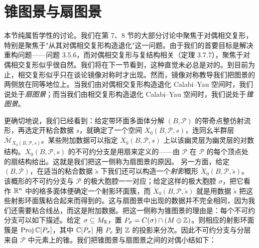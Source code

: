 \section{锥图景与扇图景}

本节纯属哲学性的讨论。我们在第 7、8 节的大部分讨论中聚焦于对偶相交复形，特别是聚焦于"从其对偶相交复形构造退化"这一问题。由于我们的首要目标是解决重构问题------问题 3.5.6，而对偶相交复形与复结构相关（定理 3.7.7），聚焦于对偶相交复形似乎很自然。我们将在下一节看到，这种直觉未必总是对的。到目前为止，相交复形似乎只在谈论镜像对称时才出现。然而，镜像对称教导我们把图景的两侧放在同等地位上。当我们由对偶相交复形构造退化 Calabi--Yau 空间时，我们说处于\emph{扇图景}；而当我们由相交复形构造退化 Calabi--Yau 空间时，我们说处于\emph{锥图景}。

更确切地说，我们已经看到：给定带环面多面体分解 $(B,\mathcal P)$ 的带奇点整仿射流形，再选定开粘合数据 $s$，就确定了一个空间 $X_0(B,\mathcal P,s)$，连同幺半群层 $\overline{\mathcal M}_{X_0(B,\mathcal P,s)}$。某些附加数据可以指定 $X_0(B,\mathcal P,s)$ 上以该幽灵层为幽灵层的对数结构。$X_0(B,\mathcal P,s)$ 的不可约分支是用扇来定义的------由 $\mathcal P$ 在 $\mathcal P$ 的每个顶点处的扇结构给出。这就是我们把这一侧称为扇图景的原因。
另一方面，给定 $(B,\mathcal P)$，在适当的粘合数据 $\check s$ 下我们还可以构造一个\emph{射影}概形 $\check X_0(B,\mathcal P,\check s)$。该概形的不可约分支与 $\mathcal P$ 的极大胞腔一一对应；给定这样的极大胞腔 $\sigma$，把它看作 $\mathbb{R}^n$ 中的格多面体便确定一个射影环面簇，而 $\check X_0(B,\mathcal P,\check s)$ 就是用数据 $\check s$ 把这些射影环面簇粘合起来而得到的。这与扇图景中出现的数据并不完全相同，因为我们还需要粘合线丛，而这是附加数据。把这一侧称为锥图景的理由是：每个不可约分支可以如下描述。给定 $\sigma\subseteq M_{\mathbb{R}}$，置 $P_\sigma=C(\sigma)\cap(M\oplus\mathbb{Z})$。则相应的射影环面簇是 $\operatorname{Proj}\mathbb{C}[P_\sigma]$，其中 $\mathbb{C}[P_\sigma]$ 用 $P_\sigma$ 到 $\mathbb{Z}$ 的投影来分次。因此不可约分支与分层来自 $\mathcal P$ 中元素上的锥。我们把锥图景与扇图景之间的对偶小结如下：
